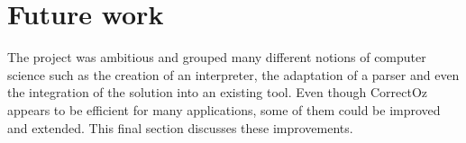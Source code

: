 \documentclass[11pt,a4paper,twoside,openright]{report}
\begin{document}




% 

% 


\section{Future work}

The project was ambitious and grouped many different notions of computer 
science such as the creation of an interpreter, the adaptation of a parser and 
even the integration of the solution into an existing tool. Even though 
CorrectOz appears to be efficient for many applications, some of them could be 
improved and extended. This final section discusses these improvements.
\end{document}
